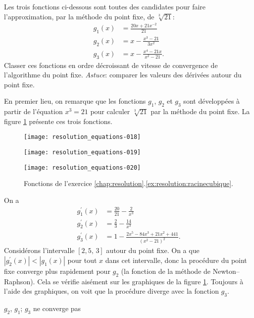 \begin{exercice}
  \label{ex:resolution:racinecubique}
  Les trois fonctions ci-dessous sont toutes des candidates pour faire
  l'approximation, par la méthode du point fixe, de $\sqrt[3]{21}$:
  \begin{align*}
    g_1(x) &= \frac{20 x + 21x^{-2}}{21} \\
    g_2(x) &= x - \frac{x^3 - 21}{3 x^2} \\
    g_3(x) &= x - \frac{x^4 - 21 x}{x^2 - 21}.
  \end{align*}
  Classer ces fonctions en ordre décroissant de vitesse de convergence
  de l'algorithme du point fixe. \emph{Astuce}: comparer les valeurs
  des dérivées autour du point fixe.
  \begin{sol}
    En premier lieu, on remarque que les fonctions $g_1$, $g_2$ et
    $g_3$ sont développées à partir de l'équation $x^3 = 21$ pour
    calculer $\sqrt[3]{21}$ par la méthode du point fixe. La figure
    \ref{fig:resolution:racinecubique} présente ces trois fonctions.
    \begin{figure}
      \centering
      \begin{minipage}[t]{0.32\linewidth}
        \centering
\texttt{[image: resolution\_equations-018]}
      \end{minipage}
      \hfill
      \begin{minipage}[t]{0.32\linewidth}
        \centering
\texttt{[image: resolution\_equations-019]}
      \end{minipage}
      \hfill
      \begin{minipage}[t]{0.32\linewidth}
        \centering
\texttt{[image: resolution\_equations-020]}
      \end{minipage}
      \caption{Fonctions de l'exercice
        \ref{chap:resolution}.\ref{ex:resolution:racinecubique}.}
      \label{fig:resolution:racinecubique}
    \end{figure}
    On a
    \begin{align*}
      g_1^\prime(x)
      &= \frac{20}{21} - \frac{2}{x^3} \\
      g_2^\prime(x)
      &= \frac{2}{3} - \frac{14}{x^3} \\
      g_3^\prime(x)
      &= 1 - \frac{2x^5 - 84 x^3 + 21 x^2 + 441}{(x^2 - 21)^2}.
    \end{align*}
    Considérons l'intervalle $[2,5,\, 3]$ autour du point fixe. On a
    que $|g_2^\prime(x)| < |g_1(x)|$ pour tout $x$ dans cet
    intervalle, donc la procédure du point fixe converge plus
    rapidement pour $g_2$ (la fonction de la méthode de
    Newton--Raphson). Cela se vérifie aisément sur les graphiques de
    la figure \ref{fig:resolution:racinecubique}. Toujours à l'aide
    des graphiques, on voit que la procédure diverge avec la fonction
    $g_3$.
  \end{sol}
  \begin{rep}
    $g_2$, $g_1$; $g_3$ ne converge pas
  \end{rep}
\end{exercice}

